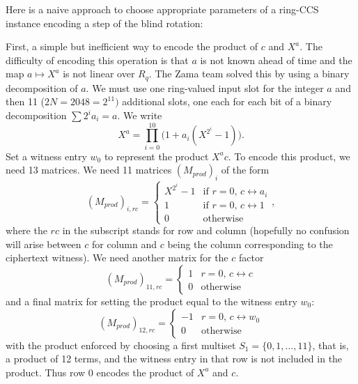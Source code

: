 \documentclass{article}
\begin{document}
Here is a naive approach to choose appropriate parameters of a ring-CCS instance encoding a step of the blind rotation:

First, a simple but inefficient way to encode the product of $c$ and $X^a$. The difficulty of encoding this operation is that $a$ is not known ahead of time and the map $a \mapsto X^a $ is not linear over $R_q$. The Zama team solved this by using a binary decomposition of $a$. We must use one ring-valued input slot for the integer $a$ and then 11 ($2N = 2048 = 2^{11})$ additional slots, one each for each bit of a binary decomposition $\sum 2^ia_i = a$. We write
\begin{equation}
    X^a = \prod_{i=0}^{10} \big(1 + a_i ( X^{2^i} - 1)\big).
\end{equation}
Set a witness entry $w_0$ to represent the product $X^a c$. To encode this product, we need 13 matrices. We need 11 matrices $(M_{prod})_i$ of the form
\begin{equation}
    (M_{prod})_{i,rc} = \begin{cases} X^{2^i} - 1 & \text{if $r=0$, $c\leftrightarrow a_i$} \\
        1 & \text{if $r=0$, $c\leftrightarrow 1$}\\
        0 & \text{otherwise}\end{cases},
\end{equation}
where the $rc$ in the subscript stands for row and column (hopefully no confusion will arise between $c$ for column and $c$ being the column corresponding to the ciphertext witness). We need another matrix for the $c$ factor
\begin{equation}
    (M_{prod})_{11,rc} = \begin{cases} 1 & \text{$r=0$, $c\leftrightarrow c$}\\
    0 & \text{otherwise}\end{cases}
\end{equation}
and a final matrix for setting the product equal to the witness entry $w_0$:
\begin{equation}
    (M_{prod})_{12,rc} = \begin{cases} -1 &\text{$r=0$, $c\leftrightarrow w_0$}\\
    0 & \text{otherwise}\end{cases}
\end{equation}
with the product enforced by choosing a first multiset $S_1 = \{0,1,\dots,11\}$, that is, a product of 12 terms, and the witness entry in that row is not included in the product. Thus row 0 encodes the product of $X^a$ and $c$.
\end{document}
